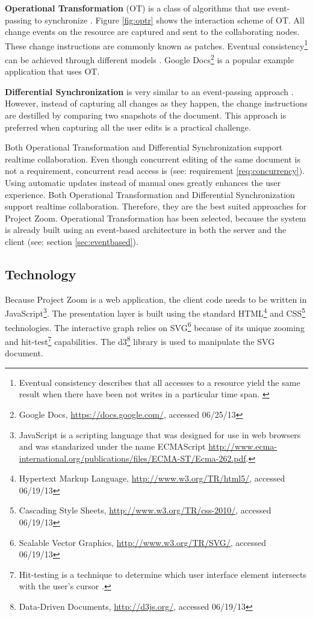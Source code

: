 \textbf{Operational Transformation} (OT) is a class of algorithms that use event-passing to synchronize \cite{Ellis_1989}. Figure \ref{fig:optr} shows the interaction scheme of OT. All change events on the resource are captured and sent to the collaborating nodes. These change instructions are commonly known as patches. Eventual consistency\footnote{Eventual consistency describes that all accesses to a resource yield the same result when there have been not writes in a particular time span. \cite{Gustavsson_2002}} can be achieved through different models \cite{Sun_1998} \cite{Li_2004} \cite{Li_2005}. Google Docs\footnote{Google Docs, \url{https://docs.google.com/}, accessed 06/25/13} is a popular example application that uses OT.

\textbf{Differential Synchronization} is very similar to an event-passing approach \cite{Fraser_2009}. However, instead of capturing all changes as they happen, the change instructions are destilled by comparing two snapshots of the document. This approach is preferred when capturing all the user edits is a practical challenge.

Both Operational Transformation and Differential Synchronization support realtime collaboration. Even though concurrent editing of the same document is not a requirement, concurrent read access is (see: requirement \ref{req:concurrency}). Using automatic updates instead of manual ones greatly enhances the user experience. Both Operational Transformation and Differential Synchronization support realtime collaboration. Therefore, they are the best suited approaches for Project Zoom. Operational Transformation has been selected, because the system is already built using an event-based architecture in both the server \cite{Bocklisch_2013} and the client (see: section \ref{sec:eventbased}).

\subsection{Technology}
Because Project Zoom is a web application, the client code needs to be written in JavaScript\footnote{JavaScript is a scripting language that was designed for use in web browsers and was standarized under the name ECMAScript \url{http://www.ecma-international.org/publications/files/ECMA-ST/Ecma-262.pdf}.}. The presentation layer is built using the standard HTML\footnote{Hypertext Markup Language, \url{http://www.w3.org/TR/html5/}, accessed 06/19/13} and CSS\footnote{Cascading Style Sheets, \url{http://www.w3.org/TR/css-2010/}, accessed 06/19/13} technologies. The interactive graph relies on SVG\footnote{Scalable Vector Graphics, \url{http://www.w3.org/TR/SVG/}, accessed 06/19/13} because of its unique zooming and hit-test\footnote{Hit-testing is a technique to determine which user interface element intersects with the user's cursor \cite{Foley_1995}.} capabilities. The d3\footnote{Data-Driven Documents, \url{http://d3js.org/}, accessed 06/19/13} library is used to manipulate the SVG document.

